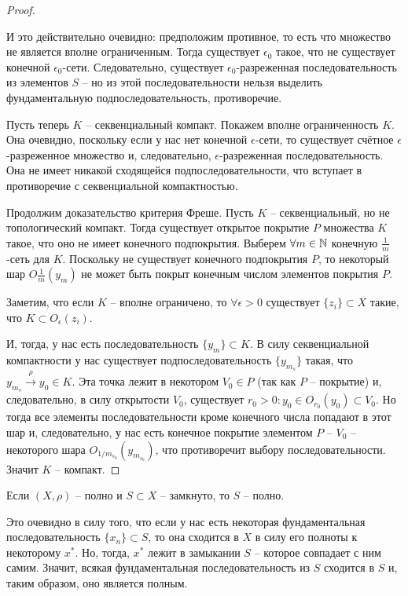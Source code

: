 \begin{proof}
\begin{note}
        И это действительно очевидно: предположим противное, то есть что множество не является вполне ограниченным.
        Тогда существует $\epsilon_0$ такое, что не существует конечной $\epsilon_0$-сети.
        Следовательно, существует $\epsilon_0$-разреженная последовательность из элементов $S$ -- но из этой последовательности нельзя выделить фундаментальную подпоследовательность, противоречие.
    \end{note}

    Пусть теперь $K$ -- секвенциальный компакт.
    Покажем вполне ограниченность $K$.
    Она очевидно, поскольку если у нас нет конечной $\epsilon$-сети, то существует счётное $\epsilon$-разреженное множество и, следовательно, $\epsilon$-разреженная последовательность.
    Она не имеет никакой сходящейся подпоследовательности, что вступает в противоречие с секвенциальной компактностью.

    Продолжим доказательство критерия Фреше.
    Пусть $K$ -- секвенциальный, но не топологический компакт.
    Тогда существует открытое покрытие $P$ множества $K$ такое, что оно не имеет конечного подпокрытия.
    Выберем $\forall m \in \mathbb{N}$ конечную $\frac{1}{m}$-сеть для $K$.
    Поскольку не существует конечного подпокрытия $P$, то некоторый шар $O\frac{1}{m}(y_m)$ не может быть покрыт конечным числом элементов покрытия $P$.
    \begin{note}
        Заметим, что если $K$ -- вполне ограничено, то $\forall \epsilon > 0$ существует $\{z_i\} \subset X$ такие, что $K \subset O_\epsilon(z_i)$. %
    \end{note}

    И, тогда, у нас есть последовательность $\{y_m\} \subset K$.
    В силу секвенциальной компактности у нас существует подпоследовательность $\{y_{m_s}\}$ такая, что $y_{m_s} \xrightarrow{\rho} y_0 \in K$.
    Эта точка лежит в некотором $V_0 \in P$ (так как $P$ -- покрытие) и, следовательно, в силу открытости $V_0$, существует $r_0 > 0\colon y_0 \in O_{r_0}(y_0) \subset V_0$.
    Но тогда все элементы последовательности кроме конечного числа попадают в этот шар и, следовательно, у нас есть конечное покрытие элементом $P$ -- $V_0$ -- некоторого шара $O_{1/m_{s_0}}(y_{m_{s_0}})$, что противоречит выбору последовательности.
    Значит $K$ -- компакт.
\end{proof}
\begin{note}
    Если $(X, \rho)$ -- полно и $S \subset X$ -- замкнуто, то $S$ -- полно.

    Это очевидно в силу того, что если у нас есть некоторая фундаментальная последовательность $\{x_n\} \subset S$, то она сходится в $X$ в силу его полноты к некоторому $x^*$.
    Но, тогда, $x^*$ лежит в замыкании $S$ -- которое совпадает с ним самим.
    Значит, всякая фундаментальная последовательность из $S$ сходится в $S$ и, таким образом, оно является полным.
\end{note}
\begin{note}

\end{note}


